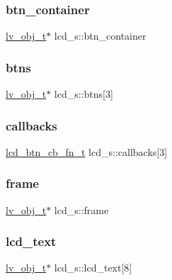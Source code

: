 \subsubsection{\texorpdfstring{btn\_container}{btn\_container}}
{\footnotesize\ttfamily \mbox{\hyperlink{lv__obj_8h_a38023c894dabf8ae85bf86aa79981ceb}{lv\+\_\+obj\+\_\+t}}$\ast$ lcd\+\_\+s\+::btn\+\_\+container}

\mbox{\label{structlcd__s_a66110a1c094e205651c998dfa28a57ff}} 
\subsubsection{\texorpdfstring{btns}{btns}}
{\footnotesize\ttfamily \mbox{\hyperlink{lv__obj_8h_a38023c894dabf8ae85bf86aa79981ceb}{lv\+\_\+obj\+\_\+t}}$\ast$ lcd\+\_\+s\+::btns\mbox{[}3\mbox{]}}

\mbox{\label{structlcd__s_a94cf01cb0d74b92bdd798b95861ed2cd}} 
\subsubsection{\texorpdfstring{callbacks}{callbacks}}
{\footnotesize\ttfamily \mbox{\hyperlink{llemu_8h_a0f5bb2a3264a6ad95973f9c8e6b3198e}{lcd\+\_\+btn\+\_\+cb\+\_\+fn\+\_\+t}} lcd\+\_\+s\+::callbacks\mbox{[}3\mbox{]}}

\mbox{\label{structlcd__s_a5067b029a06de4122b9629596a96ab2a}} 
\subsubsection{\texorpdfstring{frame}{frame}}
{\footnotesize\ttfamily \mbox{\hyperlink{lv__obj_8h_a38023c894dabf8ae85bf86aa79981ceb}{lv\+\_\+obj\+\_\+t}}$\ast$ lcd\+\_\+s\+::frame}

\mbox{\label{structlcd__s_a79e5229a56be1854fa2f61cb6089f1c3}} 
\subsubsection{\texorpdfstring{lcd\_text}{lcd\_text}}
{\footnotesize\ttfamily \mbox{\hyperlink{lv__obj_8h_a38023c894dabf8ae85bf86aa79981ceb}{lv\+\_\+obj\+\_\+t}}$\ast$ lcd\+\_\+s\+::lcd\+\_\+text\mbox{[}8\mbox{]}}

